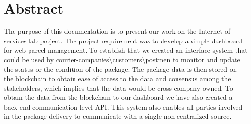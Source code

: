 \chapter*{Abstract}
\label{cha:abstract}
\vspace{10 mm}

The purpose of this documentation is to present our work on the Internet of services lab project. The project requirement was to develop a simple dashboard for web parcel management. To establish that we created an interface system that could be used by courier-companies\textbackslash customers\textbackslash postmen to monitor and update the status or the condition of the package. The package data is then stored on the blockchain to obtain ease of access to the data and consensus among the stakeholders, which implies that the data would be cross-company owned. To obtain the data from the blockchain to our dashboard we have also created a back-end communication level API.
This system also enables all parties involved in the package delivery to communicate with a single non-centralized source.
